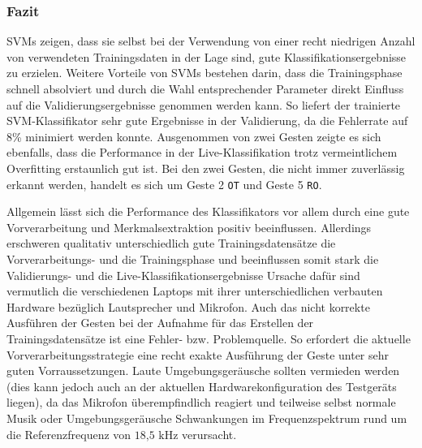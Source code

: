 \subsubsection{Fazit}\label{sec:svm_conclusion}
\ac{SVM}s zeigen, dass sie selbst bei der Verwendung von einer recht niedrigen Anzahl von verwendeten Trainingsdaten in der Lage sind, gute Klassifikationsergebnisse zu erzielen.
Weitere Vorteile von \ac{SVM}s bestehen darin, dass die Trainingsphase schnell absolviert und durch die Wahl entsprechender Parameter direkt Einfluss auf die Validierungsergebnisse genommen werden kann.
So liefert der trainierte \ac{SVM}-Klassifikator sehr gute Ergebnisse in der Validierung, da die Fehlerrate auf 8\% minimiert werden konnte.
Ausgenommen von zwei Gesten zeigte es sich ebenfalls, dass die Performance in der Live-Klassifikation trotz vermeintlichem Overfitting erstaunlich gut ist.
Bei den zwei Gesten, die nicht immer zuverlässig erkannt werden, handelt es sich um Geste 2 \texttt{\ac{OT}} und Geste 5 \texttt{\ac{RO}}.

Allgemein lässt sich die Performance des Klassifikators vor allem durch eine gute Vorverarbeitung und Merkmalsextraktion positiv beeinflussen.
Allerdings erschweren qualitativ unterschiedlich gute Trainingsdatensätze die Vorverarbeitungs- und die Trainingsphase und beeinflussen somit stark die Validierungs- und die Live-Klassifikationsergebnisse
Ursache dafür sind vermutlich die verschiedenen Laptops mit ihrer unterschiedlichen verbauten Hardware bezüglich Lautsprecher und Mikrofon.
Auch das nicht korrekte Ausführen der Gesten bei der Aufnahme für das Erstellen der Trainingsdatensätze ist eine Fehler- bzw. Problemquelle.
So erfordert die aktuelle Vorverarbeitungsstrategie eine recht exakte Ausführung der Geste unter sehr guten Vorraussetzungen.
Laute Umgebungsgeräusche sollten vermieden werden (dies kann jedoch auch an der aktuellen Hardwarekonfiguration des Testgeräts liegen), da das Mikrofon überempfindlich reagiert und teilweise selbst normale Musik oder Umgebungsgeräusche Schwankungen im Frequenzspektrum rund um die Referenzfrequenz von $18\text{,}5\text{ kHz}$ verursacht.
